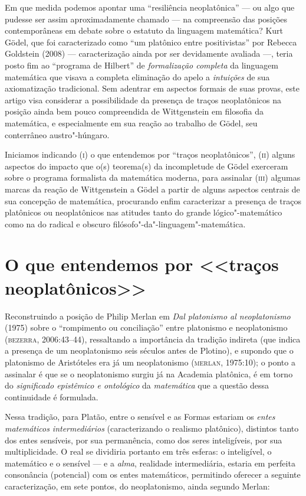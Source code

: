 {Em que medida podemos apontar uma
``resiliência neoplatônica'' ---
ou algo que pudesse ser assim aproximadamente chamado --- na
compreensão das posições contemporâneas em debate sobre o
estatuto da linguagem matemática? Kurt Gödel, que foi
caracterizado como “um platônico entre positivistas” por Rebecca
Goldstein (2008) --- caracterização ainda por ser devidamente
avaliada ---, teria posto fim ao “programa de Hilbert” de
\emph{formalização completa} da linguagem matemática que
visava a completa eliminação do apelo a \emph{intuições} de
sua axiomatização tradicional. Sem adentrar em aspectos formais
de suas provas, este artigo visa considerar a possibilidade da
presença de traços neoplatônicos na posição ainda bem pouco
compreendida de Wittgenstein em filosofia da matemática, e
especialmente em sua reação ao trabalho de Gödel, seu
conterrâneo austro"-húngaro.

Iniciamos indicando (\textsc{i}) o que entendemos por “traços
neoplatônicos”, (\textsc{ii}) alguns aspectos do impacto que o(s)
teorema(s) da incompletude de Gödel exerceram sobre o programa
formalista da matemática moderna, para assinalar (\textsc{iii}) algumas
marcas da reação de Wittgenstein a Gödel a partir de alguns
aspectos centrais de sua concepção de matemática, procurando
enfim caracterizar a presença de traços platônicos ou
neoplatônicos nas atitudes tanto do grande lógico"-matemático
como na do radical e obscuro filósofo"-da"-linguagem"-matemática.

\section{O que entendemos por <<traços
neoplatônicos>>}

Reconstruindo a posição de Philip Merlan  em \emph{Dal
platonismo al neoplatonismo} (1975) sobre o “rompimento ou
conciliação” entre platonismo e neoplatonismo (\textsc{bezerra},
2006:43--44), ressaltando a importância da tradição indireta (que
indica a presença de um neoplatonismo seis séculos antes de
Plotino), e supondo que o platonismo de Aristóteles era já um
neoplatonismo (\textsc{merlan}, 1975:10); o ponto a assinalar é que se o
neoplatonismo surgiu já na Academia platônica, é em torno do
\emph{significado epistêmico e ontológico} da
\emph{matemática} que a questão dessa continuidade é
formulada.

Nessa tradição, para Platão, entre o sensível e as Formas
estariam os \emph{entes matemáticos intermediários}
(caracterizando o realismo platônico), distintos tanto dos
entes sensíveis, por sua permanência, como dos seres
inteligíveis, por sua multiplicidade. O real se dividiria
portanto em três esferas: o inteligível, o matemático e o
sensível --- e a \emph{alma}, realidade intermediária, estaria
em perfeita consonância (potencial) com os entes matemáticos,
permitindo oferecer a seguinte caracterização, em sete pontos,
do neoplatonismo, ainda segundo Merlan:

}
